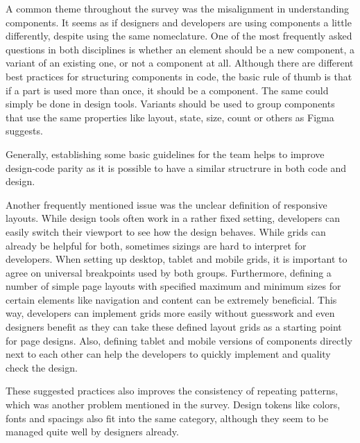 
A common theme throughout the survey was the misalignment in understanding components. It seems as
if designers and developers are using components a little differently, despite using the same
nomeclature. One of the most frequently asked questions in both disciplines is whether an element
should be a new component, a variant of an existing one, or not a component at all. Although there
are different best practices for structuring components in code, the basic rule of thumb is that if
a part is used more than once, it should be a component. The same could simply be done in design
tools. Variants should be used to group components that use the same properties like layout, state,
size, count or others as Figma suggests.  

Generally, establishing some basic guidelines for the team helps to improve design-code parity as it
is possible to have a similar structrure in both code and design. 

Another frequently mentioned issue was the unclear definition of responsive layouts. While design
tools often work in a rather fixed setting, developers can easily switch their viewport to see how
the design behaves. While grids can already be helpful for both, sometimes sizings are hard to
interpret for developers. When setting up desktop, tablet and mobile grids, it is important to agree
on universal breakpoints used by both groups. Furthermore, defining a number of simple page layouts
with specified maximum and  minimum sizes for certain elements like navigation and content can be
extremely beneficial. 
This way, developers can implement grids more easily without guesswork and even designers benefit as 
they can take these defined layout grids as a starting point for page designs. Also, defining tablet
and mobile versions of components directly next to each other can help the developers to quickly
implement and quality check the design. 

These suggested practices also improves the consistency of repeating patterns, which was another
problem mentioned in the survey. Design tokens like colors, fonts and spacings also fit into the
same category, although they seem to be managed quite well by designers already.

